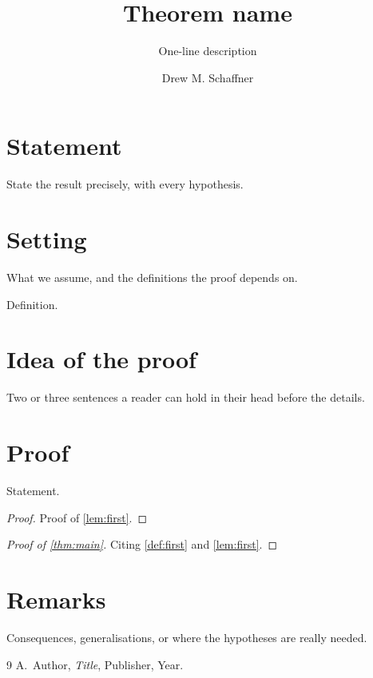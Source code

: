 \documentclass[11pt,a4paper]{article}
\title{Theorem name}
\subtitle{One-line description}
\author{Drew M. Schaffner}
\begin{document}
\maketitle

\section{Statement}

\begin{theorem}\label{thm:main}
  State the result precisely, with every hypothesis.
\end{theorem}

\section{Setting}

What we assume, and the definitions the proof depends on.

\begin{definition}[Term]\label{def:first}
  Definition.
\end{definition}

\section{Idea of the proof}

Two or three sentences a reader can hold in their head before the details.

\section{Proof}

\begin{lemma}\label{lem:first}
  Statement.
\end{lemma}

\begin{proof}
  Proof of \cref{lem:first}.
\end{proof}

\begin{proof}[Proof of \cref{thm:main}]
  Citing \cref{def:first} and \cref{lem:first}.
\end{proof}

\section{Remarks}

\begin{remark}
  Consequences, generalisations, or where the hypotheses are really needed.
\end{remark}

\begin{thebibliography}{9}
   A.~Author, \emph{Title}, Publisher, Year.
\end{thebibliography}
\end{document}
